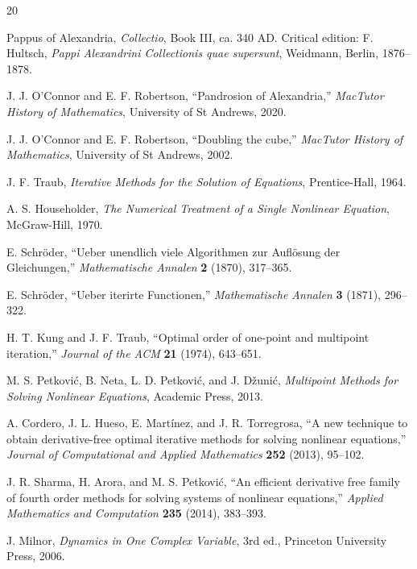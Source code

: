 \documentclass[10pt,a4paper]{article}
\theoremstyle{plain}
\theoremstyle{definition}
\theoremstyle{remark}
\begin{document}
\begin{thebibliography}{20}

Pappus of Alexandria,
\textit{Collectio}, Book III, ca. 340 AD.
Critical edition: F. Hultsch, \textit{Pappi Alexandrini Collectionis quae supersunt},
Weidmann, Berlin, 1876--1878.

J. J. O'Connor and E. F. Robertson,
``Pandrosion of Alexandria,''
\textit{MacTutor History of Mathematics}, University of St Andrews, 2020.

J. J. O'Connor and E. F. Robertson,
``Doubling the cube,''
\textit{MacTutor History of Mathematics}, University of St Andrews, 2002.

J. F. Traub,
\textit{Iterative Methods for the Solution of Equations},
Prentice-Hall, 1964.

A. S. Householder,
\textit{The Numerical Treatment of a Single Nonlinear Equation},
McGraw-Hill, 1970.

E. Schr\"oder,
``Ueber unendlich viele Algorithmen zur Aufl\"osung der Gleichungen,''
\textit{Mathematische Annalen} \textbf{2} (1870), 317--365.

E. Schr\"oder,
``Ueber iterirte Functionen,''
\textit{Mathematische Annalen} \textbf{3} (1871), 296--322.

H. T. Kung and J. F. Traub,
``Optimal order of one-point and multipoint iteration,''
\textit{Journal of the ACM} \textbf{21} (1974), 643--651.

M. S. Petkovi\'c, B. Neta, L. D. Petkovi\'c, and J. D\v{z}uni\'c,
\textit{Multipoint Methods for Solving Nonlinear Equations},
Academic Press, 2013.

A. Cordero, J. L. Hueso, E. Mart\'inez, and J. R. Torregrosa,
``A new technique to obtain derivative-free optimal iterative methods for solving nonlinear equations,''
\textit{Journal of Computational and Applied Mathematics} \textbf{252} (2013), 95--102.

J. R. Sharma, H. Arora, and M. S. Petkovi\'c,
``An efficient derivative free family of fourth order methods for solving systems of nonlinear equations,''
\textit{Applied Mathematics and Computation} \textbf{235} (2014), 383--393.

J. Milnor,
\textit{Dynamics in One Complex Variable},
3rd ed., Princeton University Press, 2006.

\end{thebibliography}
\end{document}
